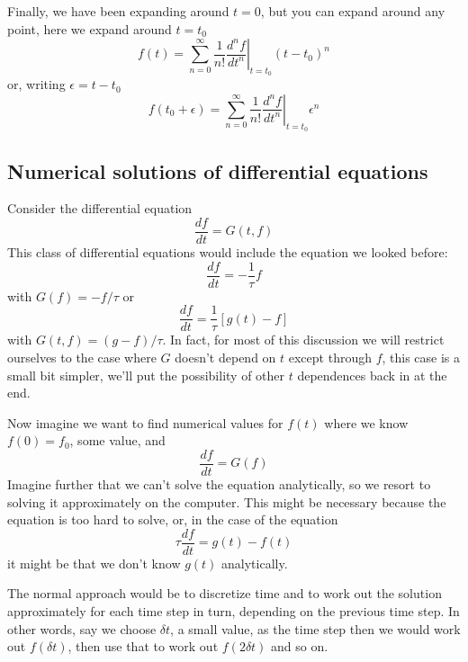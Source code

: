 \documentclass[12pt]{article}
\begin{document}
Finally, we have been expanding around $t=0$, but you can expand around any point, here we expand around $t=t_0$
\begin{equation}
f(t)=\sum_{n=0}^\infty\frac{1}{n!}\left.\frac{d^nf}{dt^n}\right|_{t=t_0}(t-t_0)^n
\end{equation}
or, writing $\epsilon=t-t_0$
\begin{equation}
f(t_0+\epsilon)=\sum_{n=0}^\infty\frac{1}{n!}\left.\frac{d^nf}{dt^n}\right|_{t=t_0}\epsilon^n
\end{equation}

\subsection*{Numerical solutions of differential equations}

Consider the differential equation
\begin{equation}
\frac{df}{dt}=G(t,f)
\end{equation}
This class of differential equations would include the equation we looked before:
\begin{equation}
\frac{df}{dt}=-\frac{1}{\tau}f
\end{equation}
with $G(f)=-f/\tau$ or
\begin{equation}
\frac{df}{dt}=\frac{1}{\tau}[g(t)-f]
\end{equation}
with $G(t,f)=(g-f)/\tau$. In fact, for most of this discussion we will
restrict ourselves to the case where $G$ doesn't depend on $t$ except
through $f$, this case is a small bit simpler, we'll put the
possibility of other $t$ dependences back in at the end.

Now imagine we want to find numerical values for $f(t)$ where we know
$f(0)=f_0$, some value, and
\begin{equation}
\frac{df}{dt}=G(f)
\end{equation}
Imagine further that we can't solve the equation analytically, so we
resort to solving it approximately on the computer. This might be
necessary because the equation is too hard to solve, or, in the case
of the equation
\begin{equation}
\tau\frac{df}{dt}=g(t)-f(t)
\end{equation}
it might be that we don't know $g(t)$ analytically.

The normal approach would be to discretize time and to work out the
solution approximately for each time step in turn, depending on the
previous time step. In other words, say we choose $\delta t$, a small
value, as the time step then we would work out $f(\delta t)$, then use
that to work out $f(2\delta t)$ and so on.
\end{document}
